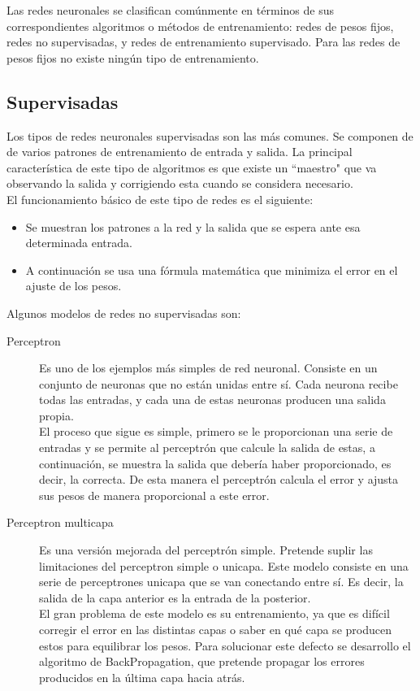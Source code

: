 \documentclass[11pt, oneside]{article}   	%
\begin{document}
Las redes neuronales se clasifican comúnmente en términos de sus  correspondientes algoritmos o métodos de entrenamiento: redes de pesos fijos, redes no supervisadas, y redes de entrenamiento supervisado. Para las redes de pesos fijos no existe ningún tipo de entrenamiento.

\subsection{Supervisadas}

Los tipos de redes neuronales supervisadas son las más comunes. Se componen de de varios patrones de entrenamiento de
entrada y salida. La principal característica de este tipo de algoritmos es que existe un ``maestro" que va observando
la salida y corrigiendo esta cuando se considera necesario.\\

El funcionamiento básico de este tipo de redes es el siguiente:
\begin{itemize}
    \item
      Se muestran los patrones a la red y la salida que se espera ante esa determinada entrada.
    \item
      A continuación se usa una fórmula matemática que minimiza el error en el ajuste de los pesos.
\end{itemize}

Algunos modelos de redes no supervisadas son:

\begin{description}
  \item[Perceptron]
    Es uno de los ejemplos más simples de red neuronal. Consiste en un conjunto de neuronas que no están unidas entre
    sí. Cada neurona recibe todas las entradas, y cada una de estas neuronas producen una salida propia. \\
    El proceso que sigue es simple, primero se le proporcionan una serie de entradas y se permite al perceptrón que calcule
    la salida de estas, a continuación, se muestra la salida que debería haber proporcionado, es decir, la correcta. De esta
    manera el perceptrón calcula el error y ajusta sus pesos de manera proporcional a este error.

  \item[Perceptron multicapa]
    Es una versión mejorada del perceptrón simple. Pretende suplir las limitaciones del perceptron simple o unicapa.
    Este modelo consiste en una serie de perceptrones unicapa que se van conectando entre sí. Es decir, la salida de la
    capa anterior es la entrada de la posterior.\\
    El gran problema de este modelo es su entrenamiento, ya que es difícil corregir el error en las distintas capas o saber
    en qué capa se producen estos para equilibrar los pesos. Para solucionar este defecto se desarrollo el algoritmo de
    BackPropagation, que pretende propagar los errores producidos en la última capa hacia atrás.
\end{description}
\end{document}

